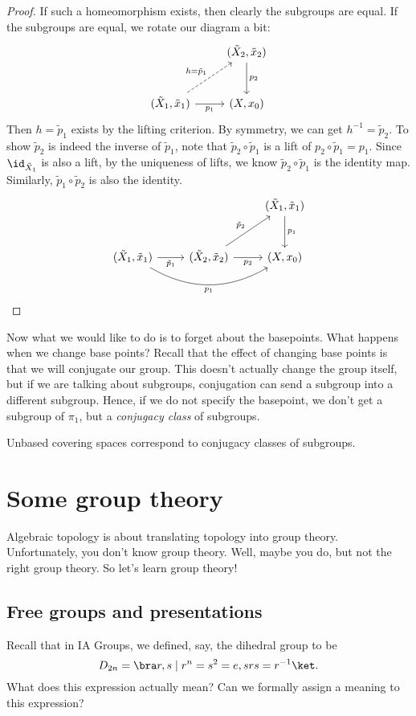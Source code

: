 \documentclass[a4paper]{article}
\begin{document}
\begin{proof}
  If such a homeomorphism exists, then clearly the subgroups are equal. If the subgroups are equal, we rotate our diagram a bit:
  \[
    \begin{tikzcd}[row sep=large]
      & (\tilde{X}_2, \tilde{x}_2) \ar[d, "p_2"]\\
      (\tilde{X}_1, \tilde{x}_1) \ar [r, "p_1"'] \ar [ru, dashed, "h = \tilde{p}_1"] & (X, x_0)
    \end{tikzcd}
  \]
  Then $h = \tilde{p}_1$ exists by the lifting criterion. By symmetry, we can get $h^{-1} = \tilde{p}_2$. To show $\tilde{p}_2$ is indeed the inverse of $\tilde{p}_1$, note that $\tilde{p}_2 \circ \tilde{p}_1$ is a lift of $p_2 \circ \tilde{p}_1 = p_1$. Since $\id_{\tilde{X}_1}$ is also a lift, by the uniqueness of lifts, we know $\tilde{p}_2 \circ \tilde{p}_1$ is the identity map. Similarly, $\tilde{p}_1 \circ \tilde{p}_2$ is also the identity.
  \[
    \begin{tikzcd}[row sep=large]
      & & (\tilde{X}_1, \tilde{x}_1) \ar[d, "p_1"]\\
      (\tilde{X}_1, \tilde{x}_1) \ar[rr, bend right, "p_1"'] \ar [r, "\tilde{p}_1"'] & (\tilde{X}_2, \tilde{x}_2) \ar [ru, "\tilde{p}_2"] \ar[r, "p_2"'] & (X, x_0)
    \end{tikzcd}
  \]
\end{proof}
Now what we would like to do is to forget about the basepoints. What happens when we change base points? Recall that the effect of changing base points is that we will conjugate our group. This doesn't actually change the group itself, but if we are talking about subgroups, conjugation can send a subgroup into a different subgroup. Hence, if we do not specify the basepoint, we don't get a subgroup of $\pi_1$, but a \emph{conjugacy class} of subgroups.

\begin{prop}
  Unbased covering spaces correspond to conjugacy classes of subgroups.
\end{prop}

\section{Some group theory}
Algebraic topology is about translating topology into group theory. Unfortunately, you don't know group theory. Well, maybe you do, but not the right group theory. So let's learn group theory!

\subsection{Free groups and presentations}
Recall that in IA Groups, we defined, say, the dihedral group to be
\[
  D_{2n} = \bra r, s \mid r^n = s^2 = e, srs = r^{-1}\ket.
\]
What does this expression actually mean? Can we formally assign a meaning to this expression?
\end{document}
